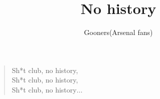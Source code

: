 \documentclass[a4paper,12pt]{article}
\title{No history}
\author{Gooners(Arsenal fans)}
\date{}
\begin{document}
	
	\maketitle
	
	\begin{verse}
		
		Sh*t club, no history, \\
		Sh*t club, no history, \\
		Sh*t club, no history$\ldots$
		
	\end{verse}
	
\end{document}
